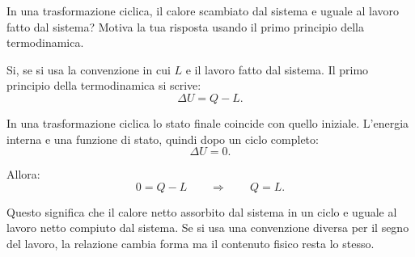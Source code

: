 
\begin{esercizio}
In una trasformazione ciclica, il calore scambiato dal sistema e uguale al
lavoro fatto dal sistema? Motiva la tua risposta usando il primo principio
della termodinamica.
\end{esercizio}

\begin{soluzione}
Si, se si usa la convenzione in cui \(L\) e il lavoro fatto dal sistema. Il
primo principio della termodinamica si scrive:
\[
\Delta U=Q-L.
\]

In una trasformazione ciclica lo stato finale coincide con quello iniziale.
L'energia interna e una funzione di stato, quindi dopo un ciclo completo:
\[
\Delta U=0.
\]

Allora:
\[
0=Q-L
\qquad\Rightarrow\qquad
Q=L.
\]

Questo significa che il calore netto assorbito dal sistema in un ciclo e uguale
al lavoro netto compiuto dal sistema. Se si usa una convenzione diversa per il
segno del lavoro, la relazione cambia forma ma il contenuto fisico resta lo
stesso.
\end{soluzione}
